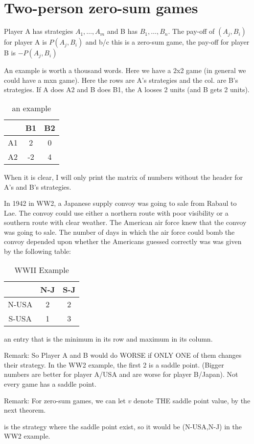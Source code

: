 \section{Two-person zero-sum games}

Player A has strategies $A_1, \dots, A_m$ and B has $B_1, \dots, B_n$. The pay-off of $(A_j, B_i)$ for player A is $P(A_j,B_i)$ and b/c this is a zero-sum game, the pay-off for player B is $-P(A_j,B_i)$


\begin{example}
An example is worth a thousand words. Here we have a 2x2 game (in general we could have a mxn game). Here the rows are A's strategies and the col. are B's strategies. If A does A2 and B does B1, the A looses 2 units (and B gets 2 units).
\begin{table}
\caption{an example}
\begin{tabular}{c | c | c}
\toprule 
  & B1 & B2\\ \hline
A1  & 2& 0\\ \hline
A2  & -2 & 4\\ 
\bottomrule
\end{tabular}
\end{table}
When it is clear, I will only print the matrix of numbers without the header for A's and B's strategies.
\end{example}



\begin{example}
In 1942  in WW2, a Japanese supply convoy was going to sale from Rabaul to Lae. The convoy could use either a northern route with poor visibility or a southern route with clear weather. The American air force knew that the convoy was going to sale. The number of days in which the air force could bomb the convoy depended upon whether the Americans guessed correctly was was given by the following table:
\begin{table}\caption{WWII Example}
\begin{tabular}{c | c | c}
\toprule 
  & N-J & S-J\\ \hline
N-USA  & 2 & 2\\ \hline
S-USA  & 1 & 3\\ 
\bottomrule
\end{tabular}
\end{table}
\end{example}


\begin{definition}
 an entry that is the minimum in its row and maximum in its column. 

Remark: So Player A and B would do WORSE if ONLY ONE of them changes their strategy. In the WW2 example, the first 2 is a saddle point. (Bigger numbers are better for player A/USA and are worse for player B/Japan). Not every game has a saddle point. 

Remark: For zero-sum games, we can let $v$ denote THE saddle point value, by the next theorem.

 is the strategy where the saddle point exist, so it would be (N-USA,N-J) in the WW2 example.
\end{definition}


